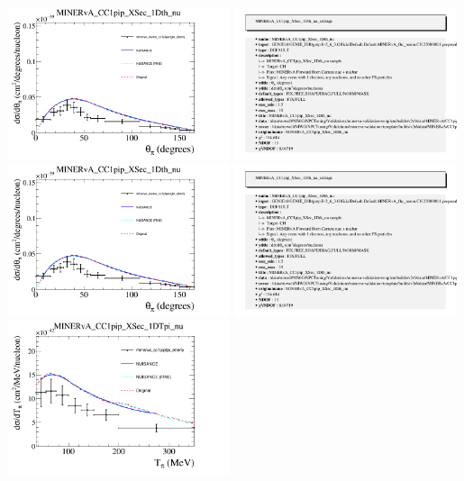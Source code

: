 \documentclass{article}
\begin{document}
\centering
\includegraphics[width=0.49\textwidth]{figures/minerva_numu_cc1pipangle_eberly_comp.png}
\includegraphics[width=0.49\textwidth]{figures/minerva_numu_cc1pipangle_eberly_info.png}
\centering
\includegraphics[width=0.49\textwidth]{figures/minerva_numu_cc1pipangle_eberly_comp.png}
\includegraphics[width=0.49\textwidth]{figures/minerva_numu_cc1pipangle_eberly_info.png}
\centering
\includegraphics[width=0.49\textwidth]{figures/minerva_cc1piptpi_eberly_comp.png}
\end{document}
